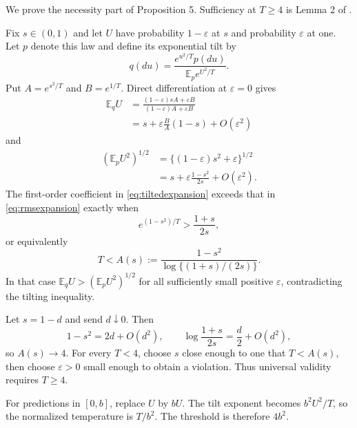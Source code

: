 \documentclass[twoside]{article}
\newcommand{\E}{\mathbb E}
\begin{document}
We prove the necessity part of Proposition 5. Sufficiency at $T\geq4$ is Lemma 2 of \citet{hogsgaard2026aggregation}.

Fix $s\in(0,1)$ and let $U$ have probability $1-\varepsilon$ at $s$ and probability $\varepsilon$ at one. Let $p$ denote this law and define its exponential tilt by
\[
q(du)=\frac{e^{u^2/T}p(du)}{\E_p e^{U^2/T}}.
\]
Put $A=e^{s^2/T}$ and $B=e^{1/T}$. Direct differentiation at $\varepsilon=0$ gives
\begin{align}
\E_qU
&=\frac{(1-\varepsilon)sA+\varepsilon B}
{(1-\varepsilon)A+\varepsilon B}\nonumber\\
&=s+\varepsilon\frac BA(1-s)+O(\varepsilon^2)
\label{eq:tiltedexpansion}
\end{align}
and
\begin{align}
(\E_pU^2)^{1/2}
&=\{(1-\varepsilon)s^2+\varepsilon\}^{1/2}\nonumber\\
&=s+\varepsilon\frac{1-s^2}{2s}+O(\varepsilon^2).
\label{eq:rmsexpansion}
\end{align}
The first-order coefficient in \eqref{eq:tiltedexpansion} exceeds that in \eqref{eq:rmsexpansion} exactly when
\[
e^{(1-s^2)/T}>\frac{1+s}{2s},
\]
or equivalently
\begin{equation}
T<A(s):=\frac{1-s^2}{\log\{(1+s)/(2s)\}}.
\label{eq:as}
\end{equation}
In that case $\E_qU>(\E_pU^2)^{1/2}$ for all sufficiently small positive $\varepsilon$, contradicting the tilting inequality.

Let $s=1-d$ and send $d\downarrow0$. Then
\[
1-s^2=2d+O(d^2),
\qquad
\log\frac{1+s}{2s}=\frac d2+O(d^2),
\]
so $A(s)\to4$. For every $T<4$, choose $s$ close enough to one that $T<A(s)$, then choose $\varepsilon>0$ small enough to obtain a violation. Thus universal validity requires $T\geq4$.

For predictions in $[0,b]$, replace $U$ by $bU$. The tilt exponent becomes $b^2U^2/T$, so the normalized temperature is $T/b^2$. The threshold is therefore $4b^2$.


\end{document}
